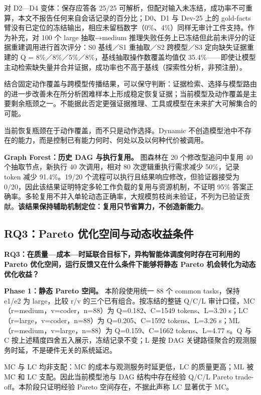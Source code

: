 对 D2---D4 变体：保存应答各 25/25 可解析，但配对输入未冻结，成功率不可重算，本文不报告任何来自会话记录的百分比；D0、D1 与 Dev-25 上的 gold-facts 臂没有已定位的冻结输出，相应未留档数字（0\%、4\%）同样无审计工件支持。作为补充，对 100 个 large 抽取→medium 推理失败任务上已冻结但此前未评分的证据重建调用进行首次评分：S0 基线／S1 重抽取／S2 跨模型／S3 定向缺失证据重建的 Q = 8\%／8\%／5\%／8\%，基线抽取操作数覆盖均值仅 35.4\%------即使让模型主动检索缺失量并合并证据，成功率也不高于基线（探索性分析，非预注册）。

结合固定动作覆盖与跨模型传播结果，可以保守判断：证据检索、选择与模型路由的进一步改善未在所分析困难样本上形成稳定恢复证据；当前模型及动作覆盖是主要剩余瓶颈之一。不能据此否定更强证据推理、工具或模型在未来扩大可解集合的可能。

当前恢复瓶颈在于动作覆盖，而不只是动作选择。Dynamic 不创造模型池中不存在的能力，而是控制已有能力何时、何处以及以何种代价被调用。

\textbf{Graph Forest：历史 DAG 与执行复用。} 图森林在 20 个修改型追问中复用 40 个抽取节点，新执行 40 次调用，相对 80 次逻辑重执行需求减少 50\%，记录 token 减少 91.4\%。19/20 个流程可以执行且结果响应修改，但验证器接受为 0/20，因此该结果证明特定多轮工作负载的复用与资源机制，不证明 95\% 答案正确率。多轮复用不并入单轮动态正确率，大规模剪枝尚未验证，不列为已验证贡献。\textbf{该结果保持辅助机制定位：复用只节省算力，不创造新能力}。

\FloatBarrier
\subsection{RQ3：Pareto 优化空间与动态收益条件}\label{sec:4-4}

\textbf{RQ3：在质量---成本---时延联合目标下，异构智能体调度何时存在可利用的 Pareto 优化空间，运行反馈又在什么条件下能够将静态 Pareto 机会转化为动态优化收益？}

\textbf{Phase 1：静态 Pareto 空间。} 本阶段使用统一 88 个 common tasks，保持 e1/e2 为 large，比较 r/v 的三个已有组合。按冻结的整链 Q/C/L 审计口径，MC（r=medium，v=coder，n=88）为 Q=0.182、C=1549 tokens、L=3.20 s；LC（r=large，v=coder，n=88）为 Q=0.205、C=1592 tokens、L=3.26 s；ML（r=medium，v=large，n=88）为 Q=0.159、C=1662 tokens、L=4.77 s。Q 与 C 按上述精度四舍五入展示，冻结记录不变；L 是按 DAG 关键路径聚合的观测服务时延，不是硬件无关的系统延迟。

MC 与 LC 均非支配：MC 的成本与观测服务时延更低，LC 的质量更高；ML 被 MC 和 LC 支配。因此当前模型池与 DAG 结构中存在经验 Q/C/L Pareto trade-off。本阶段只证明经验 Pareto 空间存在，不据此声称 LC 显著优于 MC。

